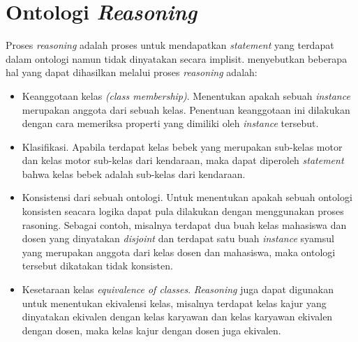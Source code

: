 \section{Ontologi \emph{Reasoning}}
Proses \emph{reasoning} adalah proses untuk mendapatkan \emph{statement} yang terdapat dalam ontologi namun tidak dinyatakan secara implisit. \citet*{antoniou} menyebutkan beberapa hal yang dapat dihasilkan melalui proses \emph{reasoning} adalah:
\begin{itemize}
	\item Keanggotaan kelas \emph{(class membership)}. Menentukan apakah sebuah \emph{instance} merupakan anggota dari sebuah kelas. Penentuan keanggotaan ini dilakukan dengan cara memeriksa properti yang dimiliki oleh \emph{instance} tersebut.
	\item Klasifikasi. Apabila terdapat kelas bebek yang merupakan sub-kelas motor dan kelas motor sub-kelas dari kendaraan, maka dapat diperoleh \emph{statement} bahwa kelas bebek adalah sub-kelas dari kendaraan.
	\item Konsistensi dari sebuah ontologi. Untuk menentukan apakah sebuah ontologi konsisten seacara logika dapat pula dilakukan dengan menggunakan proses rasoning. Sebagai contoh, misalnya terdapat dua buah kelas mahasiswa dan dosen yang dinyatakan \emph{disjoint} dan terdapat satu buah \emph{instance} syamsul yang merupakan anggota dari kelas dosen dan mahasiswa, maka ontologi tersebut dikatakan tidak konsisten.
	\item Kesetaraan kelas \emph{equivalence of classes}. \emph{Reasoning} juga dapat digunakan untuk menentukan ekivalensi kelas, misalnya terdapat kelas kajur yang dinyatakan ekivalen dengan kelas karyawan dan kelas karyawan ekivalen dengan dosen, maka kelas kajur dengan dosen juga ekivalen. 
\end{itemize}